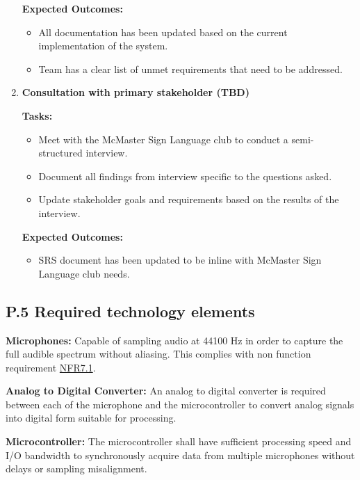 \documentclass[12pt]{article}
\theoremstyle{definition}
\begin{document}
\begin{enumerate}
  \textbf{Expected Outcomes:}
  \begin{itemize}
      \item All documentation has been updated based on the current
      implementation of the system. 
      \item Team has a clear list of unmet requirements that need to be
      addressed. 
  \end{itemize}

  \vspace{0.8em}
  
  \item \textbf{Consultation with primary stakeholder (TBD)}    

  \textbf{Tasks:}
  \begin{itemize}
      \item Meet with the McMaster Sign Language club to conduct a
      semi-structured interview.
      \item Document all findings from interview specific to the questions
      asked. 
      \item Update stakeholder goals and requirements based on the results of
      the interview. 
  \end{itemize}

  \textbf{Expected Outcomes:}
  \begin{itemize}
      \item SRS document has been updated to be inline with McMaster Sign
      Language club needs. 
  \end{itemize}

  \vspace{0.8em}

\end{enumerate}


\subsection{P.5 Required technology elements}

\textbf{Microphones:}
Capable of sampling audio at 44100 Hz in order to capture the full audible
spectrum without aliasing. This complies with non function requirement
\hyperref[NFR7_1]{NFR7.1}.
  
\textbf{Analog to Digital Converter:}
An analog to digital converter is required between each of the microphone and
the microcontroller to convert analog signals into digital form suitable for
processing.
  
\textbf{Microcontroller:} 
The microcontroller shall have sufficient processing speed and I/O bandwidth to
synchronously acquire data from multiple microphones without delays or sampling
misalignment.
\end{document}
